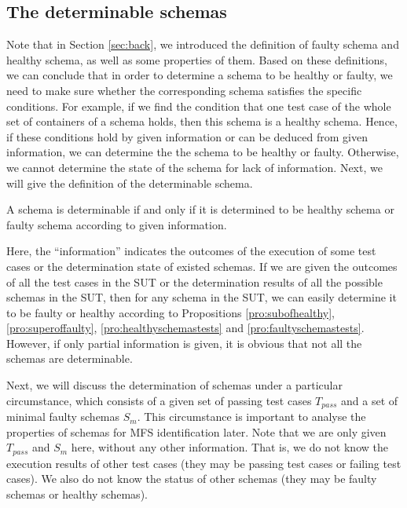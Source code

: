 \subsection{The determinable schemas}\label{sec:pending:determinable}
Note that in Section \ref{sec:back}, we introduced the definition of faulty schema and healthy schema, as well as some properties of them. Based on these definitions, we can conclude that in order to determine a schema to be healthy or faulty, we need to make sure whether the corresponding schema satisfies the specific conditions. For example, if we find the condition that one test case of the whole set of containers of a schema holds, then this schema is a healthy schema. Hence, if these conditions hold by given information or can be deduced from given information, we can determine the the schema to be healthy or faulty. Otherwise, we cannot determine the state of the schema for lack of information. Next, we will give the definition of the determinable schema.


\begin{definition}\label{de:deteminable}
A schema is determinable if and only if it is determined to be healthy schema or faulty schema according to given information.
\end{definition}

Here, the ``information'' indicates the outcomes of the execution of some test cases or the determination state of existed schemas. If we are given the outcomes of all the test cases in the SUT or the determination results of all the possible schemas in the SUT, then for any schema in the SUT, we can easily determine it to be faulty or healthy according to Propositions \ref{pro:subofhealthy}, \ref{pro:superoffaulty}, \ref{pro:healthyschemastests} and \ref{pro:faultyschemastests}. However, if only partial information is given, it is obvious that not all the schemas are determinable.

Next, we will discuss the determination of schemas under a particular circumstance, which consists of a given set of passing test cases $T_{pass}$ and a set of minimal faulty schemas $S_{m}$. This circumstance is important to analyse the properties of schemas for MFS identification later.  Note that we are only given $T_{pass}$ and $S_{m}$ here, without any other information. That is, we do not know the execution results of other test cases (they may be passing test cases or failing test cases). We also do not know the status of other schemas (they may be faulty schemas or healthy schemas).

